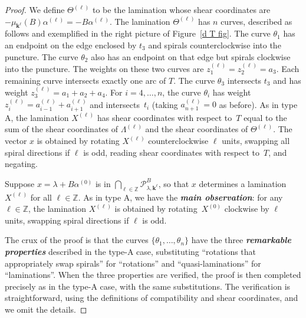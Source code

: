 \documentclass{amsart}
\theoremstyle{definition}
\theoremstyle{remark}
\numberwithin{equation}{section}
\newcommand{\newword}[1]{\textbf{\emph{#1}}}
\newcommand{\integers}{\mathbb Z}
\newcommand{\set}[1]{{\lbrace #1 \rbrace}}
\newcommand{\0}{{\mathbf{0}}}
\newcommand{\kk}{{\boldsymbol{k}}}
\renewcommand{\P}{\mathcal{P}}
\begin{document}
\begin{proof}
We define $\Theta^{(\ell)}$ to be the lamination whose shear coordinates are $-\mu_{\kk^\ell}(B)\alpha^{(\ell)}=-B\alpha^{(\ell)}$.
The lamination $\Theta^{(\ell)}$ has $n$ curves, described as follows and exemplified in the right picture of  Figure~\ref{d T fig}.
The curve $\theta_1$ has an endpoint on the edge enclosed by $t_3$ and spirals counterclockwise into the puncture.
The curve $\theta_2$ also has an endpoint on that edge but spirals clockwise into the puncture.
The weights on these two curves are $z_1^{(\ell)}=z_2^{(\ell)}=a_3$.
Each remaining curve intersects exactly one arc of $T$.
The curve $\theta_3$ intersects $t_3$ and has weight $z_3^{(\ell)}=a_1+a_2+a_4$.
For $i=4,\ldots,n$, the curve $\theta_i$ has weight $z_i^{(\ell)}=a_{i-1}^{(\ell)}+a_{i+1}^{(\ell)}$ and intersects~$t_i$ (taking $a_{n+1}^{(\ell)}=0$ as before).
As in type A, the lamination $X^{(\ell)}$ has shear coordinates with respect to~$T$ equal to the sum of the shear coordinates of $\Lambda^{(\ell)}$ and the shear coordinates of $\Theta^{(\ell)}$.
The vector $x$ is obtained by rotating $X^{(\ell)}$ counterclockwise $\ell$ units, swapping all spiral directions if $\ell$ is odd, reading shear coordinates with respect to~$T$, and negating.

Suppose $x=\lambda+B\alpha^{(0)}$ is in $\bigcap_{\ell\in\integers}\P^B_{\lambda,\kk^\ell}$, so that $x$ determines a lamination $X^{(\ell)}$ for all $\ell\in\integers$.
As in type A, we have the \newword{main observation}:
for any $\ell\in\integers$, the lamination $X^{(\ell)}$ is obtained by rotating~$X^{(0)}$ clockwise by $\ell$ units, swapping spiral directions if $\ell$ is odd.

The crux of the proof is that the curves $\set{\theta_1,\ldots,\theta_n}$ have the three \newword{remarkable properties} described in the type-A case, substituting ``rotations that appropriately swap spirals'' for ``rotations'' and ``quasi-laminations'' for ``laminations''.
When the three properties are verified, the proof is then completed precisely as in the type-A case, with the same substitutions.
The verification is straightforward, using the definitions of compatibility and shear coordinates, and we omit the details.


\end{proof}
\end{document}
